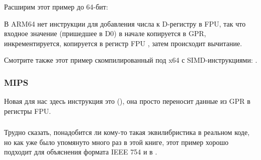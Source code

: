 Расширим этот пример до 64-бит:



В ARM64 нет инструкции для добавления числа к D-регистру в FPU, так что входное значение
(пришедшее в D0) в начале копируется в \ac{GPR},
инкрементируется, копируется в регистр FPU , затем происходит вычитание.



Смотрите также этот пример скомпилированный под x64 с SIMD-инструкциями: .

\subsubsection{MIPS}

Новая для нас здесь инструкция это  (), она просто переносит данные из \ac{GPR} в регистры FPU.



\subsubsection{\Conclusion}

Трудно сказать, понадобится ли кому-то такая эквилибристика в реальном коде,
но как уже было упомянуто много раз в этой книге, этот пример хорошо подходит для объяснения формата
IEEE 754 и  в \CCpp.

